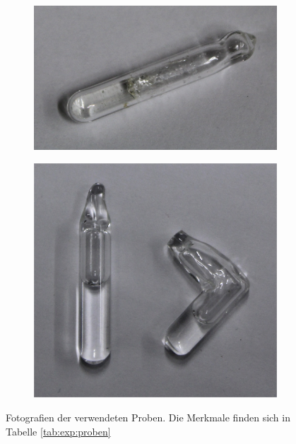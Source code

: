 \begin{figure}[H]
\begin{subfigure}{.24\textwidth}
		\caption{ }
		\label{fig:exp:probe_b}
	\end{subfigure}
	\begin{subfigure}{.24\textwidth}
		\centering
		\includegraphics[width=\textwidth]{graphics/proben/CRN_neu.jpg}
		\caption{ }
		\label{fig:exp:probe_c}
	\end{subfigure}
	\begin{subfigure}{.24\textwidth}
		\centering
		\includegraphics[width=\textwidth]{graphics/proben/RbCl_in_D20.jpg}
		\caption{ }
		\label{fig:exp:probe_d}
	\end{subfigure}
	\caption{Fotografien der verwendeten Proben. Die Merkmale finden sich in Tabelle \ref{tab:exp:proben}}
	\label{fig:exp:proben}
\end{figure}

